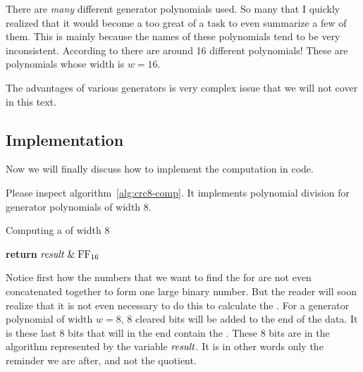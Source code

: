 There are \textit{many} different \crc generator polynomials used. So
many that I quickly realized that it would become a too great of a
task to even summarize a few of them. This is mainly because the names
of these polynomials tend to be very inconsistent. According to
\cite{cook:_catal_crc} there are around 16 different \crcst
polynomials! These are polynomials whose width is $w=16$.

The advantages of various generators is very complex issue that we will
not cover in this text.

\subsection{Implementation}

Now we will finally discuss how to implement the \crc computation in
code.

Please inspect algorithm~\ref{alg:crc8-comp}. It implements
polynomial division for generator polynomials of width 8.

\begin{algorithm}[H]
  \caption{Computing a \crc of width 8}
  \label{alg:crc8-comp}
  \begin{algorithmic}[1]


    \Else
    \EndIf
    \EndRepeatn

    \EndForEach

    \State \textbf{return}  $\mathit{result} \mathrel{\&} \mbox{\ensuremath{\mathrm{FF}_{16}}}$
    \EndProcedure

  \end{algorithmic}
\end{algorithm}

Notice first how the numbers that we want to find the \crc for are not
even concatenated together to form one large binary number.  But the
reader will soon realize that it is not even necessary to do this to
calculate the \crc.  For a generator polynomial of width $w=8$, $8$
cleared bits will be added to the end of the data. It is these last
$8$ bits that will in the end contain the \crc. These 8 bits are in the
algorithm represented by the variable $\mathit{result}$. It is in other words
only the reminder we are after, and not the quotient.


